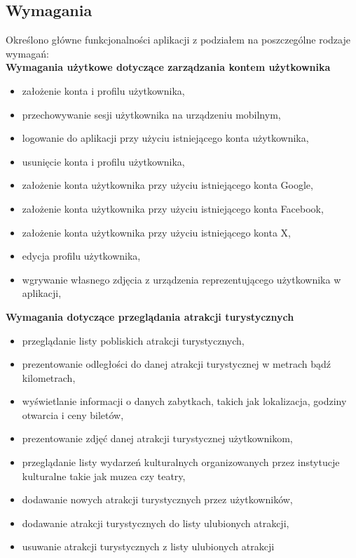     \subsection{Wymagania}
    Określono główne funkcjonalności aplikacji z podziałem na poszczególne rodzaje wymagań: \\
    \textbf{Wymagania użytkowe dotyczące zarządzania kontem użytkownika}
    \begin{itemize}
        \item założenie konta i profilu użytkownika,
        \item przechowywanie sesji użytkownika na urządzeniu mobilnym,
        \item logowanie do aplikacji przy użyciu istniejącego konta użytkownika,
        \item usunięcie konta i profilu użytkownika,
        \item założenie konta użytkownika przy użyciu istniejącego konta Google,
        \item założenie konta użytkownika przy użyciu istniejącego konta Facebook,
        \item założenie konta użytkownika przy użyciu istniejącego konta X,
        \item edycja profilu użytkownika,
        \item wgrywanie własnego zdjęcia z urządzenia reprezentującego użytkownika w aplikacji,
    \end{itemize}
    \textbf{Wymagania dotyczące przeglądania atrakcji turystycznych}
    \begin{itemize}
        \item przeglądanie listy pobliskich atrakcji turystycznych,
        \item prezentowanie odległości do danej atrakcji turystycznej w metrach bądź kilometrach,
        \item wyświetlanie informacji o danych zabytkach, takich jak lokalizacja, godziny otwarcia i ceny biletów,
        \item prezentowanie zdjęć danej atrakcji turystycznej użytkownikom,
        \item przeglądanie listy wydarzeń kulturalnych organizowanych przez instytucje kulturalne takie jak muzea czy teatry,
        \item dodawanie nowych atrakcji turystycznych przez użytkowników,
        \item dodawanie atrakcji turystycznych do listy ulubionych atrakcji,
        \item usuwanie atrakcji turystycznych z listy ulubionych atrakcji
    \end{itemize}
